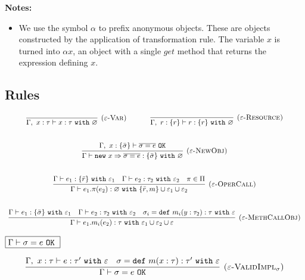 \documentclass{llncs}
\newcommand{\keywadj}[1]{\mathtt{#1}}
\newcommand{\keyw}[1]{\keywadj{#1}~}
\begin{document}
\noindent \textbf{Notes:}
\begin{itemize}
	\item We use the symbol $\alpha$ to prefix anonymous objects. These are objects constructed by the application of transformation rule. The variable $x$ is turned into $\alpha x$, an object with a single $get$ method that returns the expression defining $x$.
\end{itemize}
\subsection{Rules}

\fbox{$\Gamma \vdash e : \tau~\keyw{with} \varepsilon$}

\[
\begin{array}{c}
\infer[\textsc{($\varepsilon$-Var)}]
  {\Gamma,~x:\tau \vdash x:\tau~ \keyw{with} \varnothing}
  {} 
~~~~~~~~~~
\infer[\textsc{($\varepsilon$-Resource)}]
  {\Gamma,~r :\{r\} \vdash r:\{ r \} ~ \keyw{with} \varnothing}
  {} \\[5ex]

\infer[\textsc{($\varepsilon$-NewObj)}]
	{\Gamma \vdash \keywadj{new}~x \Rightarrow \overline{\sigma = e} : \{ \bar \sigma \}~\keyw{with} \varnothing}
	{\Gamma,~x : \{ \bar \sigma \} \vdash \overline{\sigma = e}~\keywadj{OK}} \\[5ex]

\infer[\textsc{($\varepsilon$-OperCall)}]
	{\Gamma \vdash e_1.\pi(e_2) : \varnothing~\keyw{with} \{ \bar r, m\} \cup \varepsilon_1 \cup \varepsilon_2}
	{\Gamma \vdash e_1 : \{ \bar r \}~ \keyw{with} \varepsilon_1 & \Gamma \vdash e_2:\tau_2~\keyw{with} \varepsilon_2 & \pi \in \Pi} \\[5ex]
	
\infer[\textsc{($\varepsilon$-MethCallObj)}]
	{\Gamma \vdash e_1.m_i(e_2):\tau~\keyw{with} \varepsilon_1 \cup \varepsilon_2 \cup \varepsilon}
	{\Gamma \vdash e_1 : \{ \bar \sigma \}~\keyw{with} \varepsilon_1 & \Gamma \vdash e_2 : \tau_2~\keyw{with} \varepsilon_2 & \sigma_i = \keyw{def} m_i(y:\tau_2):\tau~\keyw{with} \varepsilon}

\end{array}
\]

$\fbox{$\Gamma \vdash \sigma = e~\keyw{OK}$}$

\[
\begin{array}{c}
\infer[\textsc{($\varepsilon$-ValidImpl$_\sigma$)}]
	{\Gamma \vdash \sigma = e~\keywadj{OK}}
	{\Gamma,~x:\tau \vdash e: \tau'~\keyw{with} \varepsilon & \sigma = \keyw{def} m(x:\tau):\tau'~\keyw{with} \varepsilon} \\[5ex]
\end{array}
\]
\end{document}
